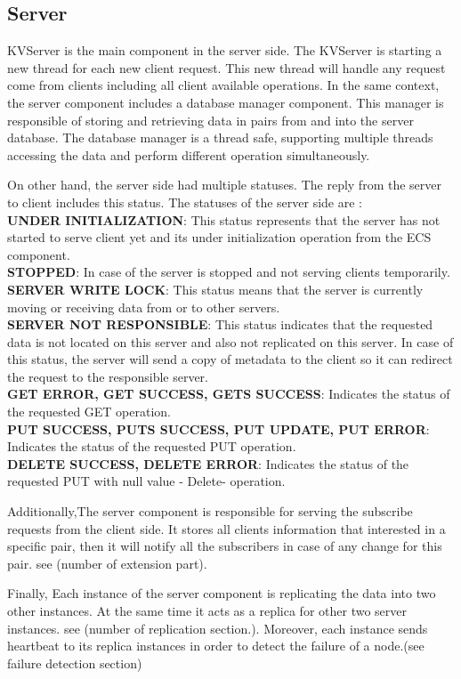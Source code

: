 \documentclass{sig-alternate}
\begin{document}
\subsection{Server}\label{serverimpl}
KVServer is the main component in the server side. The KVServer is starting a new thread for each new client request. This new thread will handle any request come from clients including all client available operations.
In the same context, the server component includes a database manager component. This manager is responsible of storing and retrieving data in pairs from and into the server database. The database manager is a thread safe, supporting multiple threads accessing the data and perform different operation simultaneously. 

On other hand, the server side had multiple statuses. The reply from the server to client includes this status. The statuses of the server side are :\\
\textbf{UNDER INITIALIZATION}: This status represents that the server has not started to serve client yet and its under initialization operation from the ECS component.\\
\textbf{STOPPED}: In case of the server is stopped and not serving clients temporarily.\\
\textbf{SERVER WRITE LOCK}: This status means that the server is currently moving or receiving data from or to other servers.\\
\textbf{SERVER NOT RESPONSIBLE}: This status indicates that the requested data is not located on this server and also not replicated on this server. In case of this status, the server will send a copy of metadata to the client so it can redirect the request to the responsible server.\\
\textbf{GET ERROR, GET SUCCESS, GETS SUCCESS}: Indicates the status of the requested GET operation.\\
\textbf{PUT SUCCESS, PUTS SUCCESS, PUT UPDATE, PUT ERROR}: Indicates the status of the requested PUT operation.\\
\textbf{DELETE SUCCESS, DELETE ERROR}: Indicates the status of the requested PUT with null value - Delete- operation.

Additionally,The server component is responsible for serving the subscribe requests from the client side. It stores all clients information that interested in a specific pair, then it will notify all the subscribers in case of any change for this pair. see (number of extension part).

Finally, Each instance of the server component is replicating the data into two other instances. At the same time it acts as a replica for other two server instances. see (number of replication section.). Moreover, each instance sends heartbeat to its replica instances in order to detect the failure of a node.(see failure detection section)
\end{document}
